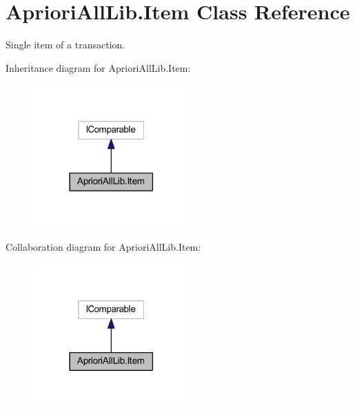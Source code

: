 \hypertarget{class_apriori_all_lib_1_1_item}{\section{Apriori\-All\-Lib.\-Item Class Reference}
\label{class_apriori_all_lib_1_1_item}
}


Single item of a transaction.  




Inheritance diagram for Apriori\-All\-Lib.\-Item\-:\nopagebreak
\begin{figure}[H]
\begin{center}
\leavevmode
\includegraphics[width=170pt]{class_apriori_all_lib_1_1_item__inherit__graph}
\end{center}
\end{figure}


Collaboration diagram for Apriori\-All\-Lib.\-Item\-:\nopagebreak
\begin{figure}[H]
\begin{center}
\leavevmode
\includegraphics[width=170pt]{class_apriori_all_lib_1_1_item__coll__graph}
\end{center}
\end{figure}
